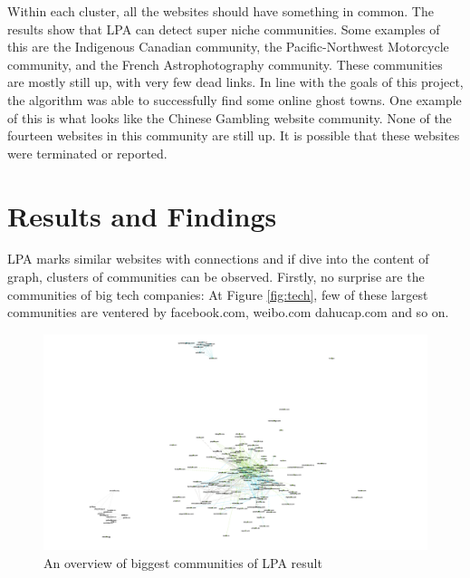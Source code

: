 \documentclass[conference]{IEEEtran}
\begin{document}
Within each cluster, all the websites should have something in common. The results show that LPA can detect super niche communities. Some examples of this are the Indigenous Canadian community, the Pacific-Northwest Motorcycle community, and the French Astrophotography community. These communities are mostly still up, with very few dead links. In line with the goals of this project, the algorithm was able to successfully find some online ghost towns. One example of this is what looks like the Chinese Gambling website community. None of the fourteen websites in this community are still up. It is possible that these websites were terminated or reported.

\section{Results and Findings}
LPA marks similar websites with connections and if dive into the content of graph, 
clusters of communities can be observed. 
Firstly, 
no surprise are the communities of big tech companies:
At Figure \ref{fig:tech}, few of these largest communities are ventered by facebook.com, weibo.com dahucap.com and so on.

\begin{figure}[htbp]
 \centerline{\includegraphics[width=\columnwidth]{figs/Huge.png}}
 \caption{An overview of biggest communities of LPA result}
\end{figure}
\end{document}
